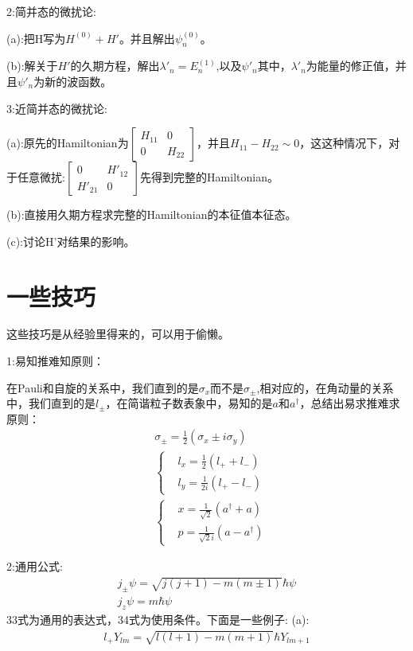 \documentclass[10pt,journal,compsoc]{IEEEtran}
\begin{document}
2:简并态的微扰论:

(a):把H写为$H^{(0)}+H'$。并且解出$\psi_n^{(0)}$。

(b):解关于$H'$的久期方程，解出$\lambda'_n=E^{(1)}_n$,以及$\psi'_n$其中，$\lambda'_n$为能量的修正值，并且$\psi'_n$为新的波函数。


3:近简并态的微扰论:

(a):原先的Hamiltonian为$\begin{bmatrix}H_{11}&0\\0&H_{22}\end{bmatrix} $，并且$H_{11}-H_{22}\sim 0$，这这种情况下，对于任意微扰:$\begin{bmatrix}0&H'_{12}\\H'_{21}&0\end{bmatrix}  $先得到完整的Hamiltonian。

(b):直接用久期方程求完整的Hamiltonian的本征值本征态。

(c):讨论H'对结果的影响。
\section{一些技巧}
这些技巧是从经验里得来的，可以用于偷懒。

1:易知推难知原则：

在Pauli和自旋的关系中，我们直到的是$\sigma_x$而不是$\sigma_{\pm}$,相对应的，在角动量的关系中，我们直到的是$l_{\pm}$，在简谐粒子数表象中，易知的是$a$和$a^{\dagger}$，总结出易求推难求原则：
\begin{align}
&
  \sigma_{\pm}=\frac12(\sigma_x\pm i\sigma_y)
\\
&\begin{cases}
  &l_x=\frac12(l_++l_-)\\
  &l_y=\frac1{2i}(l_+-l_-)
\end{cases}\\
&\begin{cases}
  & x=\frac1{\sqrt{2}}(a^{\dagger}+a)\\
  & p=\frac1{\sqrt{2}i}(a-a^{\dagger})
\end{cases}
\end{align}

2:通用公式:
\begin{align}
  j_{\pm}\psi=\sqrt{j(j+1)-m(m\pm1)}\hbar \psi\\
  j_z\psi=m\hbar\psi
\end{align}
33式为通用的表达式，34式为使用条件。下面是一些例子:
(a):\begin{align}
  l_+Y_{lm}=\sqrt{l(l+1)-m(m+1)}\hbar Y_{lm+1}
\end{align}
\end{document}
